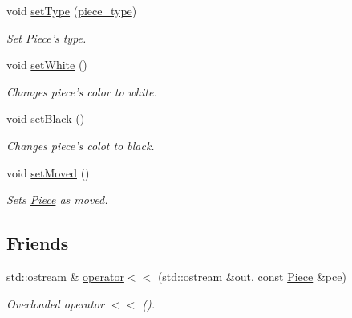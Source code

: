 \begin{DoxyCompactItemize}
void \hyperlink{classChEngn_1_1Piece_a4b66b79da54172c50072df90fae47b3e}{setType} (\hyperlink{namespaceChEngn_a2a35c185f259757a78e937575b8ed483}{piece\_\-type})
\begin{DoxyCompactList}\small\item\em Set Piece's type. \item\end{DoxyCompactList}\item 
\hypertarget{classChEngn_1_1Piece_a93b4da88b5b3bd52c025895ea9296b42}{
void \hyperlink{classChEngn_1_1Piece_a93b4da88b5b3bd52c025895ea9296b42}{setWhite} ()}
\label{classChEngn_1_1Piece_a93b4da88b5b3bd52c025895ea9296b42}

\begin{DoxyCompactList}\small\item\em Changes piece's color to white. \item\end{DoxyCompactList}\item 
\hypertarget{classChEngn_1_1Piece_a28f4d2b27bebe4cf45a9a44aeaaf1f93}{
void \hyperlink{classChEngn_1_1Piece_a28f4d2b27bebe4cf45a9a44aeaaf1f93}{setBlack} ()}
\label{classChEngn_1_1Piece_a28f4d2b27bebe4cf45a9a44aeaaf1f93}

\begin{DoxyCompactList}\small\item\em Changes piece's colot to black. \item\end{DoxyCompactList}\item 
void \hyperlink{classChEngn_1_1Piece_a49e68ef199415d60ea2a394501a52f5a}{setMoved} ()
\begin{DoxyCompactList}\small\item\em Sets \hyperlink{classChEngn_1_1Piece}{Piece} as moved. \item\end{DoxyCompactList}\end{DoxyCompactItemize}
\subsection*{Friends}
\begin{DoxyCompactItemize}
\item 
std::ostream \& \hyperlink{classChEngn_1_1Piece_a5e9692fde1be0ae7eda4e5cd3fc42f6d}{operator$<$$<$} (std::ostream \&out, const \hyperlink{classChEngn_1_1Piece}{Piece} \&pce)
\begin{DoxyCompactList}\small\item\em Overloaded operator $<$$<$ (). \item\end{DoxyCompactList}\end{DoxyCompactItemize}


